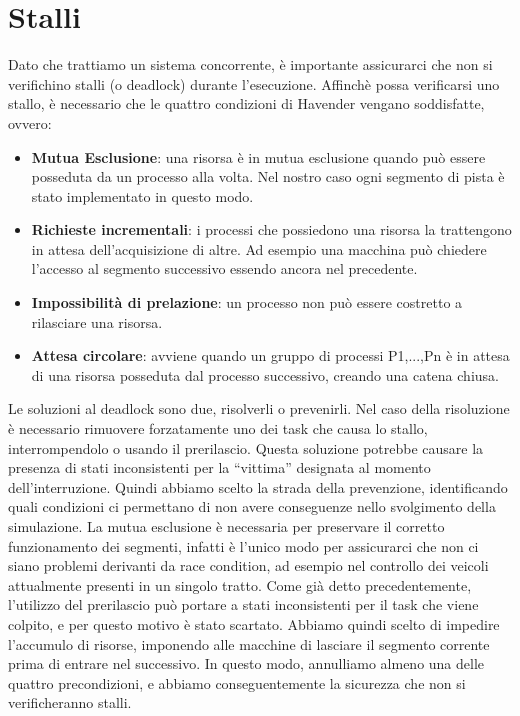 
\section{Stalli}
Dato che trattiamo un sistema concorrente, è importante assicurarci che non si verifichino stalli (o deadlock) durante l’esecuzione.
Affinchè possa verificarsi uno stallo, è necessario che le quattro condizioni di Havender vengano soddisfatte, ovvero:
\begin{itemize}
 \item \textbf{Mutua Esclusione}: una risorsa è in mutua esclusione quando può essere posseduta da un processo alla volta. Nel nostro caso ogni segmento di pista è stato implementato in questo modo.
 \item \textbf{Richieste incrementali}: i processi che possiedono una risorsa la trattengono in attesa dell’acquisizione di altre. Ad esempio una macchina può chiedere l’accesso al segmento successivo essendo ancora nel precedente.
 \item \textbf{Impossibilità di prelazione}: un processo non può essere costretto a rilasciare una risorsa.
 \item \textbf{Attesa circolare}: avviene quando un gruppo di processi P1,...,Pn è in attesa di una risorsa posseduta dal processo successivo, creando una catena chiusa.
\end{itemize}
Le soluzioni al deadlock sono due, risolverli o prevenirli. Nel caso della risoluzione è necessario rimuovere forzatamente uno dei task che causa lo stallo, interrompendolo o usando il prerilascio. Questa soluzione potrebbe causare la presenza di stati inconsistenti per la “vittima” designata al momento dell’interruzione. 
Quindi abbiamo scelto la strada della prevenzione, identificando quali condizioni ci permettano di non avere conseguenze nello svolgimento della simulazione.
La mutua esclusione è necessaria per preservare il corretto funzionamento dei segmenti, infatti è l’unico modo per assicurarci che non ci siano problemi derivanti da race condition, ad esempio nel controllo dei veicoli attualmente presenti in un singolo tratto.
Come già detto precedentemente, l’utilizzo del prerilascio può portare a stati inconsistenti per il task che viene colpito, e per questo motivo è stato scartato.
Abbiamo quindi scelto di impedire l’accumulo di risorse, imponendo alle macchine di lasciare il segmento corrente prima di entrare nel successivo. In questo modo, annulliamo almeno una delle quattro precondizioni, e abbiamo conseguentemente la sicurezza che non si verificheranno stalli.


